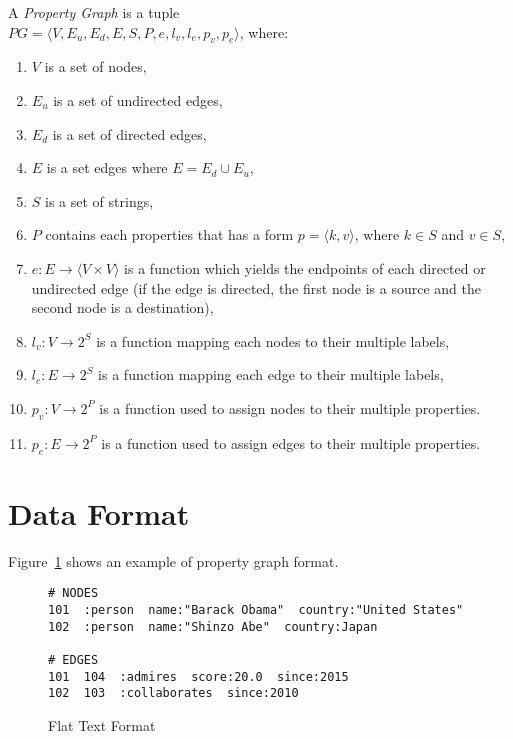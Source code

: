 \documentclass[runningheads]{llncs}
\begin{document}
\begin{defi}

A \emph{Property Graph} is a tuple  \\ 
$PG = \langle V, E_u, E_d, E, S, P, e, l_v, l_e, p_v, p_e\rangle$, where:
\begin{enumerate}
    \item $V$ is a set of nodes,
    \item $E_u$ is a set of undirected edges,
    \item $E_d$ is a set of directed edges,
    \item $E$ is a set edges where $E = E_d \cup E_u$,
    \item $S$ is a set of strings,
    \item $P$ contains each properties that has a form $p = \langle k,v \rangle$, where $k \in S$ and $v \in S$,
    \item $e: E \to \langle V \times V \rangle$ is a function which yields the endpoints of each directed or undirected edge (if the edge is directed, the first node is a source and the second node is a destination),
    \item $l_v : V \to 2^S$ is a function mapping each nodes to their multiple labels,
    \item $l_e : E \to 2^S$ is a function mapping each edge to their multiple labels,
    \item $p_v : V \to 2^P$ is a function used to assign nodes to their multiple properties.
    \item $p_e : E \to 2^P$ is a function used to assign edges to their multiple properties.
\end{enumerate}
\end{defi}


\section{Data Format}

Figure~\ref{fig:format-pg} shows an example of property graph format.

\begin{figure}[!t]
\vspace{2mm}
\begin{scriptsize}
\begin{verbatim}
# NODES
101  :person  name:"Barack Obama"  country:"United States"
102  :person  name:"Shinzo Abe"  country:Japan

# EDGES
101  104  :admires  score:20.0  since:2015
102  103  :collaborates  since:2010
\end{verbatim}
\end{scriptsize}
\caption{Flat Text Format}
\label{fig:format-pg}
\end{figure}
\end{document}
